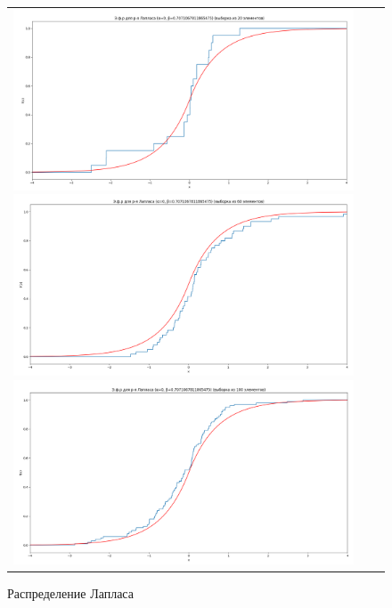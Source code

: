 \begin{figure}[H]
	\begin{tabular}{ccc}
		\includegraphics[scale=0.14]{resources/4_laplace_20.png}
		\includegraphics[scale=0.14]{resources/4_laplace_60.png}
		\includegraphics[scale=0.14]{resources/4_laplace_100.png}
	\end{tabular}
	\caption{Распределение Лапласа}
\end{figure}

